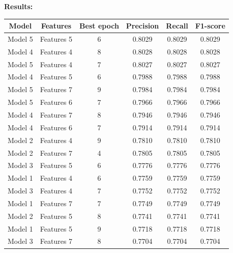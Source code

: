 \textbf{Results:}
\begin{table}[!h]
    \centering
    \begin{tabular}{c|c|c|c|c|c}
        \textbf{Model} & \textbf{Features} & \textbf{Best epoch} & \textbf{Precision} & \textbf{Recall} & \textbf{F1-score} \\ \hline
        Model 5     &   	Features 5      &   	6       &   	0.8029  &   	0.8029  &   	0.8029  \\
        Model 4     &   	Features 4      &   	8       &   	0.8028  &   	0.8028  &   	0.8028  \\
        Model 5     &   	Features 4      &   	7       &   	0.8027  &   	0.8027  &   	0.8027  \\
        Model 4     &   	Features 5      &   	6       &   	0.7988  &   	0.7988  &   	0.7988  \\
        Model 5     &   	Features 7      &   	9       &   	0.7984  &   	0.7984  &   	0.7984  \\
        Model 5     &   	Features 6      &   	7       &   	0.7966  &   	0.7966  &   	0.7966  \\
        Model 4     &   	Features 7      &   	8       &   	0.7946  &   	0.7946  &   	0.7946  \\
        Model 4     &   	Features 6      &   	7       &   	0.7914  &   	0.7914  &   	0.7914  \\
        Model 2     &   	Features 4      &   	9       &   	0.7810  &   	0.7810  &   	0.7810  \\
        Model 2     &   	Features 7      &   	4       &   	0.7805  &   	0.7805  &   	0.7805  \\
        Model 3     &   	Features 5      &   	6       &   	0.7776  &   	0.7776  &   	0.7776  \\
        Model 1     &   	Features 4      &   	6       &   	0.7759  &   	0.7759  &   	0.7759  \\
        Model 3     &   	Features 4      &   	7       &   	0.7752  &   	0.7752  &   	0.7752  \\
        Model 1     &   	Features 7      &   	7       &   	0.7749  &   	0.7749  &   	0.7749  \\
        Model 2     &   	Features 5      &   	8       &   	0.7741  &   	0.7741  &   	0.7741  \\
        Model 1     &   	Features 5      &   	9       &   	0.7718  &   	0.7718  &   	0.7718  \\
        Model 3     &   	Features 7      &   	8       &   	0.7704  &   	0.7704  &   	0.7704  \\

\end{tabular}
\end{table}
